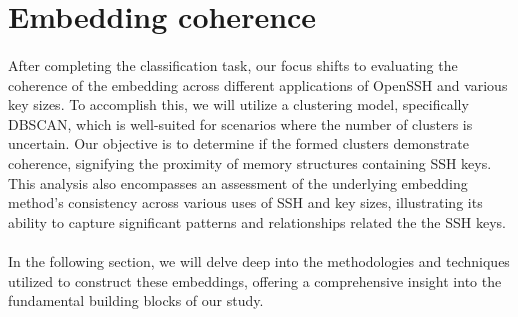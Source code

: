     \section{Embedding coherence}
        \paragraph{}After completing the classification task, our focus shifts to evaluating the coherence of the embedding across different applications of OpenSSH and various key sizes. To accomplish this, we will utilize a clustering model, specifically DBSCAN, which is well-suited for scenarios where the number of clusters is uncertain. Our objective is to determine if the formed clusters demonstrate coherence, signifying the proximity of memory structures containing SSH keys. This analysis also encompasses an assessment of the underlying embedding method's consistency across various uses of SSH and key sizes, illustrating its ability to capture significant patterns and relationships related the the SSH keys.

        \paragraph{}In the following section, we will delve deep into the methodologies and techniques utilized to construct these embeddings, offering a comprehensive insight into the fundamental building blocks of our study.